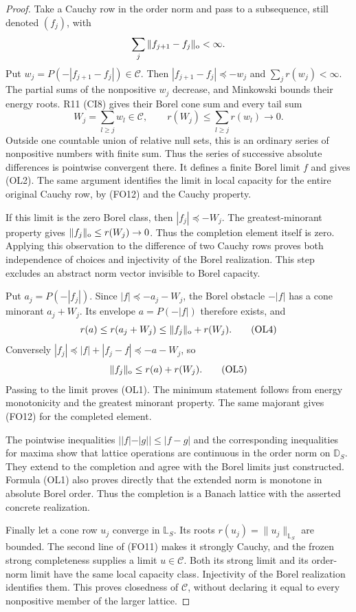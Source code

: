 \documentclass[11pt,a4paper]{article}
\numberwithin{equation}{section}
\theoremstyle{definition}
\theoremstyle{remark}
\begin{document}
\begin{proof}
Take a Cauchy row in the order norm and pass to a subsequence,
still denoted $(f_j)$, with
\[
                 \sum_j\|f_{j+1}-f_j\|_{\rm o}<\infty.
\]
Put $w_j=P(-|f_{j+1}-f_j|)\in\mathscr C$.  Then
$|f_{j+1}-f_j|\preceq-w_j$ and
$\sum_jr(w_j)<\infty$.  The partial sums of the nonpositive
$w_j$ decrease, and Minkowski bounds their energy roots.
R11 \textup{(CI8)} gives their Borel cone sum and every
tail sum
\[
 W_j=\sum_{l\ge j}w_l\in\mathscr C,\qquad
 r(W_j)\le\sum_{l\ge j}r(w_l)\longrightarrow0.
 \tag{OL3}
\]
Outside one countable union of relative null sets, this is
an ordinary series of nonpositive numbers with finite sum.
Thus the series of successive absolute differences is
pointwise convergent there.  It defines a finite Borel
limit $f$ and gives \textup{(OL2)}.  The same argument
identifies the limit in local capacity for the entire
original Cauchy row, by \textup{(FO12)} and the Cauchy
property.

If this limit is the zero Borel class, then
$|f_j|\preceq-W_j$.  The greatest-minorant property gives
$\|f_j\|_{\rm o}\le r(W_j)\to0$.  Thus the completion
element itself is zero.  Applying this observation to
the difference of two Cauchy rows proves both independence
of choices and injectivity of the Borel realization.  This
step excludes an abstract norm vector invisible to Borel
capacity.

Put $a_j=P(-|f_j|)$.  Since
$|f|\preceq-a_j-W_j$, the Borel obstacle $-|f|$ has
a cone minorant $a_j+W_j$.  Its envelope $a=P(-|f|)$
therefore exists, and
\[
 r(a)\le r(a_j+W_j)\le\|f_j\|_{\rm o}+r(W_j).
 \tag{OL4}
\]
Conversely $|f_j|\preceq|f|+|f_j-f|\preceq-a-W_j$,
so
\[
                  \|f_j\|_{\rm o}\le r(a)+r(W_j).
 \tag{OL5}
\]
Passing to the limit proves \textup{(OL1)}.  The minimum
statement follows from energy monotonicity and the greatest
minorant property.  The same majorant gives
\textup{(FO12)} for the completed element.

The pointwise inequalities
$||f|-|g||\le|f-g|$ and the corresponding inequalities
for maxima show that lattice operations are continuous
in the order norm on $\mathbb D_S$.  They extend to the
completion and agree with the Borel limits just constructed.
Formula \textup{(OL1)} also proves directly that the extended
norm is monotone in absolute Borel order.  Thus the completion
is a Banach lattice with the asserted concrete realization.

Finally let a cone row $u_j$ converge in $\mathbb L_S$.
Its roots $r(u_j)=\|u_j\|_{\mathbb L_S}$ are bounded.
The second line of \textup{(FO11)} makes it strongly
Cauchy, and the frozen strong completeness supplies a
limit $u\in\mathscr C$.  Both its strong limit and its
order-norm limit have the same local capacity class.
Injectivity of the Borel realization identifies them.
This proves closedness of $\mathscr C$, without declaring
it equal to every nonpositive member of the larger lattice.
\end{proof}
\end{document}
